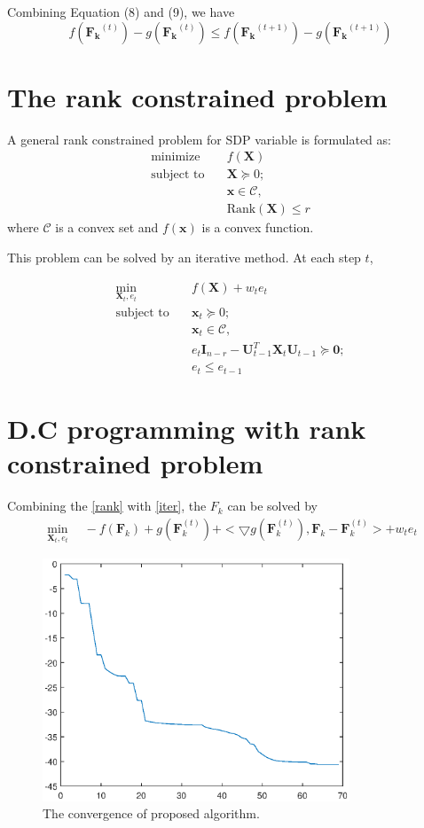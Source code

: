 \documentclass[12pt]{article}
\begin{document}
Combining Equation (8) and (9), we have 
\begin{equation}
f(\bm{F_k}^{(t)}) - g(\bm{F_k}^{(t)}) \leq f(\bm{F_k}^{(t+1)}) - g(\bm{F_k}^{(t+1)}) 
\end{equation}

\section{The rank constrained problem}
A general rank constrained problem for SDP variable is formulated as:
\begin{align}
	\text{minimize} & \quad f(\bm{X}) \\
	\text{subject to}& \quad \bm{X} \succeq 0;\nonumber\\
	& \quad \bm{x} \in \mathcal{C}, \nonumber\\
	& \quad \text{Rank}(\bm{X})\leq r
\end{align}
where $\mathcal{C}$ is a convex set and $f(\bm{x})$ is a convex function.

This problem can be solved by an iterative method. At each step $t$,

\begin{align} \label{rank}
\min_{\bm{X}_t, e_t} & \quad f(\bm{X})  + w_t e_t \\
\text{subject to}& \quad \bm{x}_t \succeq 0;\nonumber\\
& \quad \bm{x}_t \in \mathcal{C}, \nonumber\\
&\quad e_t\bm{I}_{n-r} - \bm{U}^T_{t-1} \bm{X}_{t} \bm{U}_{t-1} \succeq \bm{0};\nonumber\\
&\quad e_t \leq e_{t-1}\nonumber
\end{align}



\section{D.C programming with rank constrained problem}

Combining the \eqref{rank} with \eqref{iter}, the $F_k$ can be solved by 
\begin{align}
\min_{\bm{X}_t, e_t} \quad -f(\bm{F}_k) + g(\bm{F}^{(t)}_k) + <\bigtriangledown g(\bm{F}^{(t)}_k), \bm{F}_k - \bm{F}^{(t)}_k> + w_t e_t
\end{align}

\begin{figure}[ht] 
	\begin{center}
		\includegraphics[width=3.6in]{t_convergence.eps}
		\caption{The convergence of proposed algorithm.}
	\end{center}
\end{figure}




\end{document}
